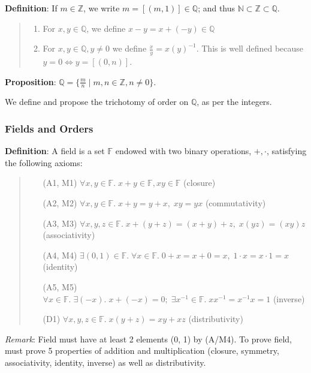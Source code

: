 \documentclass[11pt]{article}
\begin{document}
\textbf{Definition}: If $m \in \mathbb{Z}$, we write $m = [(m,1)] \in \mathbb{Q}$; and thus $\mathbb{N} \subset \mathbb{Z} \subset \mathbb{Q}$.
\begin{quote}\vspace{-0.3cm}
	\begin{enumerate}
	\item For $x,y \in \mathbb{Q}$, we define $x-y = x+(-y) \in \mathbb{Q}$
	\item For $x,y \in \mathbb{Q}, y \neq 0$ we define $\frac{x}{y} = x(y)^{-1}$. This is well defined because $y=0 \iff y = [(0,n)]$.\end{enumerate}
\end{quote}
\textbf{Proposition}: $\mathbb{Q} = \{\frac{m}{n} \;|\; m,n \in \mathbb{Z}, n \neq 0\}$.

We define and propose the trichotomy of order on $\mathbb{Q}$, as per the integers.

\subsubsection{Fields and Orders}

\textbf{Definition}: A field is a set $\mathbb{F}$ endowed with two binary operations, $+, \cdot$, satisfying the following axioms:
\begin{quote}\vspace{-0.3cm}
	\begin{enumerate}
	\item[(A1, M1)] $\forall x,y \in \mathbb{F}.\; x+y \in \mathbb{F}, xy \in \mathbb{F}$ (closure)
	\item[(A2, M2)] $\forall x,y \in \mathbb{F}.\; x + y = y + x,\; xy = yx$ (commutativity)
	\item[(A3, M3)] $\forall x,y,z \in \mathbb{F}.\; x + (y+z) = (x+y) + z,\; x(yz) = (xy)z$ (associativity)
	\item[(A4, M4)] $\exists (0,1) \in \mathbb{F}.\; \forall x \in \mathbb{F}.\; 0 + x = x + 0 = x,\; 1 \cdot x = x \cdot 1 = x$ (identity)
	\item[(A5, M5)] $\forall x \in \mathbb{F}.\; \exists (-x).\; x + (-x) = 0;\; \exists x^{-1} \in \mathbb{F}.\; xx^{-1} = x^{-1}x = 1$ (inverse)
	\item[(D1)] $\forall x,y,z \in \mathbb{F}.\; x(y+z) = xy + xz$ (distributivity)
	\end{enumerate}
\end{quote}

\emph{Remark}: Field must have at least 2 elements (0, 1) by (A/M4). To prove field, must prove 5 properties of addition and multiplication (closure, symmetry, associativity, identity, inverse) as well as distributivity.
\end{document}
